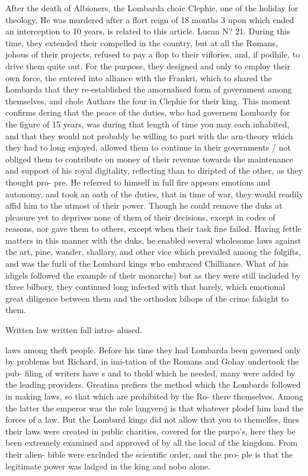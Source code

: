 After the death of Albioners, the Lombarda choic Clephie, one of the holiday for theology. He was murdered after a flort reign of 18 months 3 upon which ended an interception to 10 years, is related to this article. Lucan N? 21. During this time, they extended their compelled in the country, but at all the Romans, johous of their projects, refused to pay a flop to their viflories, and, if podhile, to drive them quite out. For the purpose, they designed and only to employ their own force, the entered into alliance with the Frankri, which to shared the Lombarda that they re-established the amornalised form of government among themselves, and chole Authars the four in Clephie for their king. This moment confirms dering that the peace of the duties, who had governem Lombardy for the figure of 15 years, was during that length of time you may each inhabited, and that they would not probably be willing to part with the arn-theory which they had to long enjoyed, allowed them to continue in their governments / not obliged them to contribute on money of their revenue towards the maintenance and support of his royal digitality, reflecting than to diripted of the other, as they thought pro- pre. He referred to himself in full fire appears emotions and autonomy, and took an oath of the duties, that in time of war, they would readily affid him to the utmost of their power. Though he could remove the duks at pleasure yet to deprives none of them of their decisions, except in codes of reasons, nor gave them to others, except when their task fine failed. Having fettle matters in this manner with the duks, he enabled several wholesome laws against the art, pine, wander, shallary, and other vice which prevailed among the folgifts, and was the furli of the Lombard kings who embraced Chilliance. What of his idigels followed the example of their monarchs) but as they were still included by three bilbory, they continued long infected with that barely, which emotional great diligence between them and the orthodox bihops of the crime falsight to them.\par\medskip
Written law written fall intro- alused.\par\medskip
laws among theft people. Before his time they had Lombarda been governed only by problems but Richard, in imi-tation of the Romans and Gohay undertook the pub- filing of writers have s and to thold which he needed, many were added by the leading providers. Greatina prefiers the method which the Lombards followed in making laws, so that which are prohibited by the Ro- there themselves. Among the latter the emperor was the role langversj is that whatever plodef him land the forces of a law. But the Lombard kings did not allow that you to themelfes, fines their laws were created in public charities, covered for the purpo’s, here they be been extremely examined and approved of by all the local of the kingdom. From their alien- bible were excluded the scientific order, and the pro- ple is that the legitimate power was ladged in the king and nobo alone.\par\medskip
